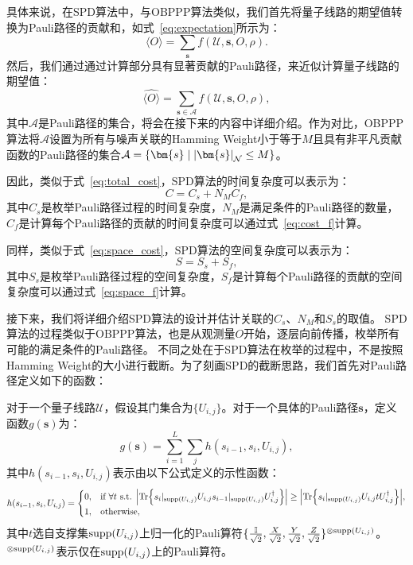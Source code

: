 具体来说，在SPD算法中，与OBPPP算法类似，我们首先将量子线路的期望值转换为Pauli路径的贡献和，如式~\eqref{eq:expectation}所示为：
\begin{equation}
    \langle O \rangle = \sum_{\bm{s}} f(\mathcal{U},\bm{s},O,\rho).
\end{equation}
然后，我们通过通过计算部分具有显著贡献的Pauli路径，来近似计算量子线路的期望值：
\begin{equation}
    \widehat{\langle O \rangle} = \sum_{\bm{s}\in \mathcal{A}} f(\mathcal{U},\bm{s},O,\rho),
\end{equation}
其中$\mathcal{A}$是Pauli路径的集合，将会在接下来的内容中详细介绍。作为对比，OBPPP算法将$\mathcal{A}$设置为所有与噪声关联的Hamming Weight小于等于$M$且具有非平凡贡献函数的Pauli路径的集合$\mathcal{A}=\{\bm{s}\mid \abs{\bm{s}}_{\mathcal{N}} \leq M\}$。

因此，类似于式~\eqref{eq:total_cost}，SPD算法的时间复杂度可以表示为：
\begin{equation}\label{eq:spd_cost}
    C = C_s+N_MC_f,
\end{equation}
其中$C_s$是枚举Pauli路径过程的时间复杂度，$N_M$是满足条件的Pauli路径的数量，$C_f$是计算每个Pauli路径的贡献的时间复杂度可以通过式~\eqref{eq:cost_f}计算。

同样，类似于式~\eqref{eq:space_cost}，SPD算法的空间复杂度可以表示为：
\begin{equation}\label{eq:spd_space}
    S = S_s+S_f,
\end{equation}
其中$S_s$是枚举Pauli路径过程的空间复杂度，$S_f$是计算每个Pauli路径的贡献的空间复杂度可以通过式~\eqref{eq:space_f}计算。

接下来，我们将详细介绍SPD算法的设计并估计关联的$C_s$、$N_M$和$S_s$的取值。
SPD算法的过程类似于OBPPP算法，也是从观测量$O$开始，逐层向前传播，枚举所有可能的满足条件的Pauli路径。
不同之处在于SPD算法在枚举的过程中，不是按照Hamming Weight的大小进行截断。为了刻画SPD的截断思路，我们首先对Pauli路径定义如下的函数：
\begin{definition}
    对于一个量子线路$\mathcal{U}$，假设其门集合为$\{U_{i,j}\}$。对于一个具体的Pauli路径$\bm{s}$，定义函数$g(\bm{s})$为：
    \begin{equation}\label{eq:spd_g}
        g(\bm{s})=\sum_{i=1}^{L}\sum_{j} h(s_{i-1},s_i,U_{i,j}),
    \end{equation}
    其中$h(s_{i-1},s_i,U_{i,j})$表示由以下公式定义的示性函数：
    \begin{equation}\label{eq:spd_h}
        h(s_{i-1},s_i,U_{i,j})=
        \begin{cases}
            0, & \text{if } \forall t \text{ s.t. } \abs{\Tr{s_i|_{\text{supp}(U_{i,j})} U_{i,j} s_{i-1}|_{\text{supp}(U_{i,j})} U_{i,j}^\dagger}} \geq \abs{\Tr{s_i|_{\text{supp}(U_{i,j})} U_{i,j} t U_{i,j}^\dagger}},\\
            1, & \text{otherwise},
        \end{cases}
    \end{equation}
    其中$t$选自支撑集$\text{supp}(U_{i,j})$上归一化的Pauli算符$\{\frac{\mathbb{I}}{\sqrt{2}},\frac{X}{\sqrt{2}},\frac{Y}{\sqrt{2}},\frac{Z}{\sqrt{2}}\}^{\otimes \text{supp}(U_{i,j})}$。$^{\otimes \text{supp}(U_{i,j})}$表示仅在$\text{supp}(U_{i,j})$上的Pauli算符。
\end{definition}

